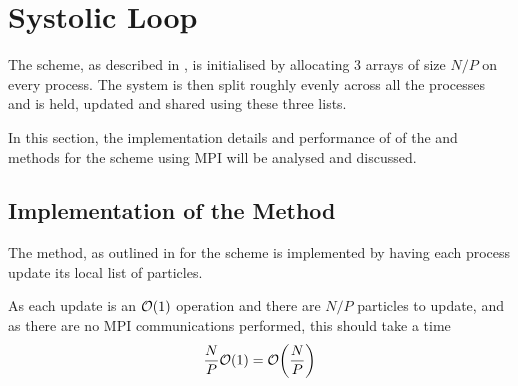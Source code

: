 \section{Systolic Loop}

The \systolicloop{} scheme, as described in
,
is initialised by allocating 3 arrays of
size $N/P$ on every process.
%
The system is then split roughly evenly across all the processes
and is held, updated and shared using these three lists.

In this section, the implementation details and performance of
of the \individualoperation{} and \pairoperation{} methods
for the \systolicloop{} scheme using MPI will be analysed and discussed.


%
%

\subsection{Implementation of the \individualoperation{} Method}

The \individualoperation{} method, as outlined in
for the \systolicloop{} scheme
is implemented by having each process update its local list of particles.

As each update is an $\mathcal{O}{\left({ 1 }\right)}$ operation and there are $N/P$ particles
to update, and as there are no MPI communications performed,
this should take a time
\begin{equation}
    \frac{N}{P}\mathcal{O}{\left({ 1 }\right)} = \mathcal{O}{\left({ \frac{N}{P} }\right)}
\end  {equation}

\begin{figure}[!h]
    
    \caption{}
    \label{fig:v0_systolic_individual_operation_512_logtime}
\end  {figure}

\begin{figure}[!h]
    
    \caption{}
    \label{fig:v0_systolic_individual_operation_4096_logtime}
\end  {figure}

\begin{figure}[!h]
    
    \caption{}
    \label{fig:v0_systolic_individual_operation_32768_logtime}
\end  {figure}

